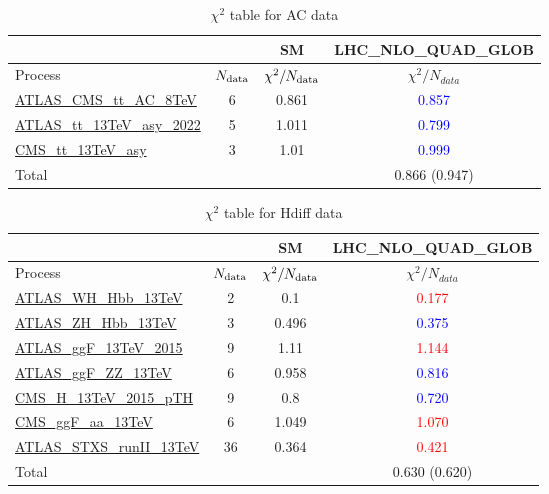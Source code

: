 \documentclass{article}
\begin{document}
\begin{table}[H]
\centering
\begin{tabular}{|l|c|c|c|}
\hline
 \multicolumn{2}{|c|}{} & SM& LHC_NLO_QUAD_GLOB\\ \hline
Process & $N_{\rm data}$ & $\chi^ 2/N_{\rm data}$& $\chi^ 2/N_{data}$\\ \hline
\href{https://arxiv.org}{ATLAS_CMS_tt_AC_8TeV} & 6 & 0.861 & \textcolor{blue}                            {0.857} \\ \hline
\href{https://arxiv.org}{ATLAS_tt_13TeV_asy_2022} & 5 & 1.011 & \textcolor{blue}                            {0.799} \\ \hline
\href{https://arxiv.org}{CMS_tt_13TeV_asy} & 3 & 1.01 & \textcolor{blue}                            {0.999} \\ \hline
\hline Total & &  & 0.866 (0.947) \\ \hline
\end{tabular}
\caption{$\chi^2$ table for AC data}
\end{table}
\begin{table}[H]
\centering
\begin{tabular}{|l|c|c|c|}
\hline
 \multicolumn{2}{|c|}{} & SM& LHC_NLO_QUAD_GLOB\\ \hline
Process & $N_{\rm data}$ & $\chi^ 2/N_{\rm data}$& $\chi^ 2/N_{data}$\\ \hline
\href{https://arxiv.org}{ATLAS_WH_Hbb_13TeV} & 2 & 0.1 & \textcolor{red}                            {0.177} \\ \hline
\href{https://arxiv.org}{ATLAS_ZH_Hbb_13TeV} & 3 & 0.496 & \textcolor{blue}                            {0.375} \\ \hline
\href{https://arxiv.org}{ATLAS_ggF_13TeV_2015} & 9 & 1.11 & \textcolor{red}                            {1.144} \\ \hline
\href{https://arxiv.org}{ATLAS_ggF_ZZ_13TeV} & 6 & 0.958 & \textcolor{blue}                            {0.816} \\ \hline
\href{https://arxiv.org}{CMS_H_13TeV_2015_pTH} & 9 & 0.8 & \textcolor{blue}                            {0.720} \\ \hline
\href{https://arxiv.org}{CMS_ggF_aa_13TeV} & 6 & 1.049 & \textcolor{red}                            {1.070} \\ \hline
\href{https://arxiv.org}{ATLAS_STXS_runII_13TeV} & 36 & 0.364 & \textcolor{red}                            {0.421} \\ \hline
\hline Total & &  & 0.630 (0.620) \\ \hline
\end{tabular}
\caption{$\chi^2$ table for Hdiff data}
\end{table}
\end{document}
